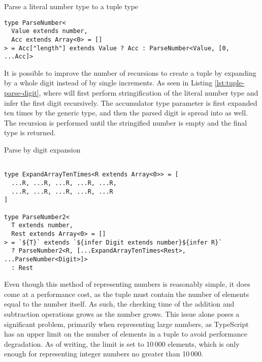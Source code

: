 \begin{listing}[ht]
  \caption{Parse a literal number type to a tuple type}\label{lst:tuple-parse}
  \begin{verbatim}
type ParseNumber<
  Value extends number,
  Acc extends Array<0> = []
> = Acc["length"] extends Value ? Acc : ParseNumber<Value, [0, ...Acc]>
\end{verbatim}
\end{listing}

It is possible to improve the number of recursions to create a tuple by expanding by a whole digit instead of by single increments. As seen in Listing \ref{lst:tuple-parse-digit}, where  will first perform stringification of the literal number type  and infer the first digit recursively. The accumulator type parameter  is first expanded ten times by the  generic type, and then the parsed digit is spread into  as well. The recursion is performed until the stringified number is empty and the final  type is returned.

\begin{listing}[ht]
  \caption{Parse by digit expansion}\label{lst:tuple-parse-digit}
  \begin{verbatim}

type ExpandArrayTenTimes<R extends Array<0>> = [
  ...R, ...R, ...R, ...R, ...R,
  ...R, ...R, ...R, ...R, ...R
]
    
type ParseNumber2<
  T extends number,
  Rest extends Array<0> = []
> = `${T}` extends `${infer Digit extends number}${infer R}`
  ? ParseNumber2<R, [...ExpandArrayTenTimes<Rest>, ...ParseNumber<Digit>]>
  : Rest
\end{verbatim}
\end{listing}

Even though this method of representing numbers is reasonably simple, it does come at a performance cost, as the tuple must contain the number of elements equal to the number itself. As such, the checking time of the addition and subtraction operations grows as the number grows. This issue alone poses a significant problem, primarily when representing large numbers, as TypeScript has an upper limit on the number of elements in a tuple to avoid performance degradation. As of writing, the limit is set to 10\,000 elements\cite{ImplementationCheckerTs2023}, which is only enough for representing integer numbers no greater than 10\,000.

